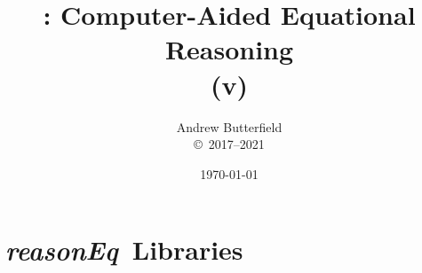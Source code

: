 \documentclass[fleqn,10pt]{report}
\author{
Andrew Butterfield
\\
{\small \copyright\ 2017--2021}
}
\title{
  \reasonEq: Computer-Aided Equational Reasoning
  \\(v\reqVersion)
}
\date{
\today
}
\def\reasonEq{\textit{\textsf{reasonEq}}}
\begin{document}
\maketitle
\tableofcontents

% 


\chapter{\reasonEq\ Libraries}


\newpage
\newpage
\newpage
\newpage
\newpage
\newpage

%
\newpage
%
%
%
%

\newpage
\end{document}
